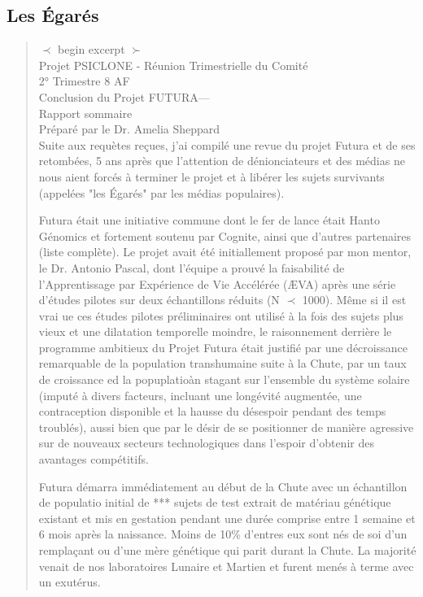\subsection{Les Égarés} 

\begin{quotation} $\prec$ begin excerpt $\succ$ \\ Projet PSICLONE - Réunion Trimestrielle du Comité\\ 2° Trimestre 8 AF\\ Conclusion du Projet FUTURA— \\ Rapport sommaire\\ Préparé par le Dr. Amelia Sheppard	\\ Suite aux requètes reçues, j'ai compilé une revue du projet Futura et de ses retombées, 5 ans après que l'attention de dénionciateurs et des médias ne nous aient forcés à terminer le projet et à libérer les sujets survivants (appelées "les Égarés" par les médias populaires). 

Futura était une initiative commune dont le fer de lance était Hanto Génomics et fortement soutenu par Cognite, ainsi que d'autres partenaires (liste complète). Le projet avait été initiallement proposé par mon mentor, le Dr. Antonio Pascal, dont l'équipe a prouvé la faisabilité de l'Apprentissage par Expérience de Vie Accélérée (ÆVA) après une série d'études pilotes sur deux échantillons réduits (N $ \prec $ 1000). Même si il est vrai ue ces études pilotes préliminaires ont utilisé à la fois des sujets plus vieux et une dilatation temporelle moindre, le raisonnement derrière le programme ambitieux du Projet Futura était justifié par une décroissance remarquable de la population transhumaine suite à la Chute, par un taux de croissance ed la popuplatioàn stagant sur l'ensemble du système solaire (imputé à divers facteurs, incluant une longévité augmentée, une contraception disponible et la hausse du désespoir pendant des temps troublés), aussi bien que par le désir de se positionner de manière agressive sur de nouveaux secteurs technologiques dans l'espoir d'obtenir des avantages compétitifs. 

Futura démarra immédiatement au début de la Chute avec un échantillon de populatio initial de *** sujets de test extrait de matériau génétique existant et mis en gestation pendant une durée comprise entre 1 semaine et 6 mois après la naissance. Moins de 10\% d'entres eux sont nés de soi d'un remplaçant ou d'une mère génétique qui parit durant la Chute. La majorité venait de nos laboratoires Lunaire et Martien et furent menés à terme avec un exutérus. 


\end{quotation}
